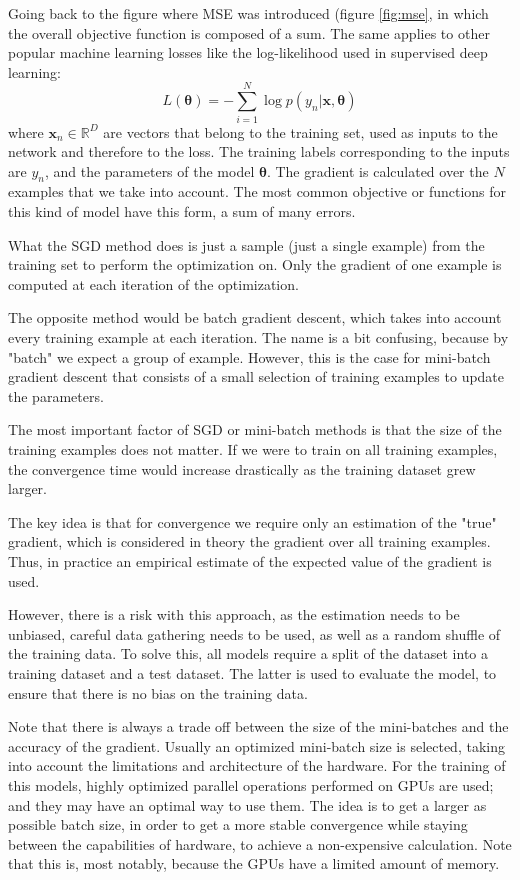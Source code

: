 \documentclass[]{article}
\theoremstyle{definition}
\begin{document}
Going back to the figure where MSE was introduced (figure \ref{fig:mse}, in which the overall objective function is composed of a sum. The same applies to other popular machine learning losses like the log-likelihood used in supervised deep learning:
\begin{equation*}
	L(\boldsymbol{\theta}) = - \sum_{i=1}^N \log p(y_n| \boldsymbol{x}, \boldsymbol{\theta})
\end{equation*}
where $\boldsymbol{x}_n \in \mathbb{R}^D$ are vectors that belong to the training set, used as inputs to the network and therefore to the loss. The training labels corresponding to the inputs are $y_n$, and the parameters of the model $\boldsymbol{\theta}$. The gradient is calculated over the $N$ examples that we take into account. The most common objective or functions for this kind of model have this form, a sum of many errors.

What the SGD method does is just a sample (just a single example) from the training set to perform the optimization on. Only the gradient of one example is computed at each iteration of the optimization.

The opposite method would be batch gradient descent, which takes into account every training example at each iteration. The name is a bit confusing, because by "batch" we expect a group of example. However, this is the case for mini-batch gradient descent that consists of a small selection of training examples to update the parameters.

The most important factor of SGD or mini-batch methods is that the size of the training examples does not matter. If we were to train on all training examples, the convergence time would increase drastically as the training dataset grew larger.

The key idea is that for convergence we require only an estimation of the "true" gradient, which is considered in theory the gradient over all training examples. Thus, in practice an empirical estimate of the expected value of the gradient is used. 

However, there is a risk with this approach, as the estimation needs to be unbiased, careful data gathering needs to be used, as well as a random shuffle of the training data. To solve this, all models require a split of the dataset into a training dataset and a test dataset. The latter is used to evaluate the model, to ensure that there is no bias on the training data.

Note that there is always a trade off between the size of the mini-batches and the accuracy of the gradient. Usually an optimized mini-batch size is selected, taking into account the limitations and architecture of the hardware. For the training of this models, highly optimized parallel operations performed on GPUs are used; and they may have an optimal way to use them. The idea is to get a larger as possible batch size, in order to get a more stable convergence while staying between the capabilities of hardware, to achieve a non-expensive calculation. Note that this is, most notably, because the GPUs have a limited amount of memory.
\end{document}
